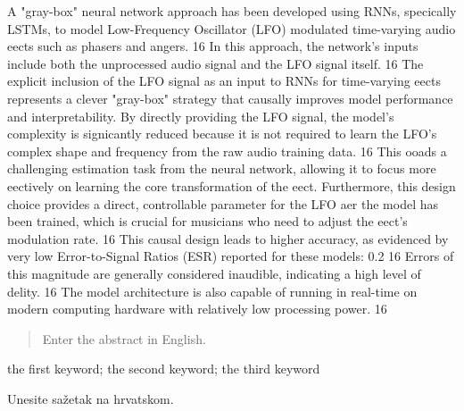 \documentclass[masterthesis]{fer}
\begin{document}
A "gray-box" neural network approach has been developed using RNNs, specically
LSTMs, to model Low-Frequency Oscillator (LFO) modulated time-varying audio
eects such as phasers and angers.
16
In this approach, the network's inputs include
both the unprocessed audio signal and the LFO signal itself.
16
The explicit inclusion of the LFO signal as an input to RNNs for time-varying eects
represents a clever "gray-box" strategy that causally improves model performance
and interpretability. By directly providing the LFO signal, the model's complexity is
signicantly reduced because it is not required to learn the LFO's complex shape and
frequency from the raw audio training data.
16 This ooads a challenging estimation
task from the neural network, allowing it to focus more eectively on learning the core
transformation of the eect. Furthermore, this design choice provides a direct,
controllable parameter for the LFO aer the model has been trained, which is crucial
for musicians who need to adjust the eect's modulation rate.
16 This causal design
leads to higher accuracy, as evidenced by very low Error-to-Signal Ratios (ESR)
reported for these models: 0.2%
16 Errors of this
magnitude are generally considered inaudible, indicating a high level of delity.
16 The
model architecture is also capable of running in real-time on modern computing
hardware with relatively low processing power.
16








\begin{abstract}
  Enter the abstract in English.
   
\end{abstract}

\begin{keywords}
  the first keyword; the second keyword; the third keyword
\end{keywords}


\begin{sazetak}
  Unesite sažetak na hrvatskom.

\end{sazetak}
\end{document}
